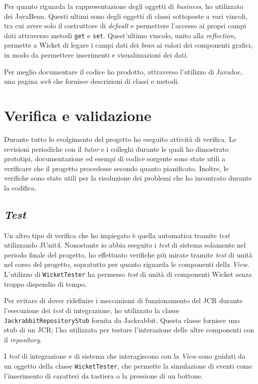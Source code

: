 	Per quanto riguarda la rappresentazione degli oggetti di \textit{business}, ho utilizzato dei JavaBean. Questi ultimi sono degli oggetti di classi sottoposte a vari vincoli, tra cui avere solo il costruttore di \textit{default} e permettere l'accesso ai propri campi dati attraverso metodi \texttt{get} e \texttt{set}. Quest'ultimo vincolo, unito alla \textit{reflection}, permette a Wicket di legare i campi dati dei \textit{bean} ai valori dei componenti grafici, in modo da permettere inserimenti e visualizzazioni dei dati.

	Per meglio documentare il codice ho prodotto, attraverso l'utilizzo di Javadoc, una pagina \textit{web} che fornisce descrizioni di classi e metodi.

		
\section{Verifica e validazione}
	Durante tutto lo svolgimento del progetto ho eseguito attività di verifica. Le revisioni periodiche con il \textit{tutor} e i colleghi durante le quali ho dimostrato prototipi, documentazione ed esempi di codice sorgente sono state utili a verificare che il progetto procedesse secondo quanto pianificato. Inoltre, le verifiche sono state utili per la risoluzione dei problemi che ho incontrato durante la codifica.
	
	\subsection{\textit{Test}}
	Un altro tipo di verifica che ho impiegato è quella automatica tramite \textit{test} utilizzando JUnit4. Nonostante io abbia eseguito i \textit{test} di sistema solamente nel periodo finale del progetto, ho effettuato verifiche più mirate tramite \textit{test} di unità nel corso del progetto, sopratutto per quanto riguarda le componenti della \textit{View}. L'utilizzo di \texttt{WicketTester} ha permesso \textit{test} di unità di componenti Wicket senza troppo dispendio di tempo.
	
	Per evitare di dover ridefinire i meccanismi di funzionamento del JCR durante l'esecuzione dei \textit{test} di integrazione, ho utilizzato la classe \texttt{JackrabbitRepositoryStub} fornita da Jackrabbit. Questa classe fornisce uno \gls{stub} di un JCR; l'ho utilizzata per testare l'interazione delle altre componenti con il \textit{repository}.
	
	I \textit{test} di integrazione e di sistema che interagiscono con la \textit{View} sono guidati da un oggetto della classe \texttt{WicketTester}, che permette la simulazione di eventi come l'inserimento di caratteri da tastiera o la pressione di un bottone.
	
